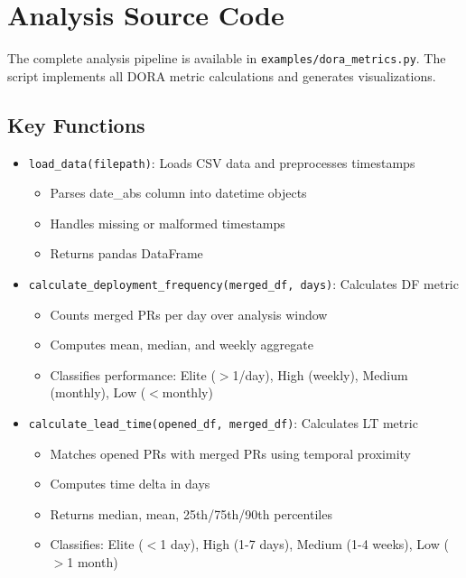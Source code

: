 \section{Analysis Source Code}

The complete analysis pipeline is available in \texttt{examples/dora\_metrics.py}. The script implements all DORA metric calculations and generates visualizations.

\subsection{Key Functions}

\begin{itemize}
    \item \texttt{load\_data(filepath)}: Loads CSV data and preprocesses timestamps
    \begin{itemize}
        \item Parses date\_abs column into datetime objects
        \item Handles missing or malformed timestamps
        \item Returns pandas DataFrame
    \end{itemize}

    \item \texttt{calculate\_deployment\_frequency(merged\_df, days)}: Calculates DF metric
    \begin{itemize}
        \item Counts merged PRs per day over analysis window
        \item Computes mean, median, and weekly aggregate
        \item Classifies performance: Elite ($>$1/day), High (weekly), Medium (monthly), Low ($<$monthly)
    \end{itemize}

    \item \texttt{calculate\_lead\_time(opened\_df, merged\_df)}: Calculates LT metric
    \begin{itemize}
        \item Matches opened PRs with merged PRs using temporal proximity
        \item Computes time delta in days
        \item Returns median, mean, 25th/75th/90th percentiles
        \item Classifies: Elite ($<$1 day), High (1-7 days), Medium (1-4 weeks), Low ($>$1 month)
    \end{itemize}


\end{itemize}
